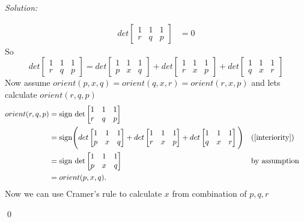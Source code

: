 \documentclass[a4paper, 8pt, oneside]{article}
\newenvironment{sol}
    {\emph{Solution:}
    }
    {
    \qed
    }
\begin{document}
\begin{enumerate}
\begin{enumerate}
\begin{sol}
\begin{align*}
det
\begin{bmatrix}
    1 & 1 & 1\\
    r & q & p
\end{bmatrix} &= 0
\end{align*}
So
\begin{equation}\label{interiority}
det
\begin{bmatrix}
    1 & 1 & 1\\
    r & q & p
\end{bmatrix} =
det
\begin{bmatrix}
    1 & 1 & 1\\
    p& x & q
\end{bmatrix} +
det
\begin{bmatrix}
    1 & 1 & 1\\
    r & x& p
\end{bmatrix} +
det
\begin{bmatrix}
    1 & 1 & 1\\
    q & x & r
\end{bmatrix} 
\end{equation}
Now assume $orient(p,x,q) =orient(q,x,r) = orient(r,x,p)$ and lets calculate $orient(r,q,p)$
\begin{align*}
orient(r,q,p) &= \text{sign det}
\begin{bmatrix}
    1 & 1 & 1\\
    r & q & p
\end{bmatrix} \\&= \text{sign} \Bigg(
det
\begin{bmatrix}
    1 & 1 & 1\\
    p& x & q
\end{bmatrix} +
det
\begin{bmatrix}
    1 & 1 & 1\\
    r & x& p
\end{bmatrix} +
det
\begin{bmatrix}
    1 & 1 & 1\\
    q & x & r
\end{bmatrix} 
\Bigg) && (\ref{interiority}) \\&=
 \text{sign det}
\begin{bmatrix}
    1 & 1 & 1\\
    p & x & q
\end{bmatrix} && \text{by assumption}  \\&= orient(p,x,q).
\end{align*}
Now we can use Cramer's rule to calculate $x$ from combination of $p, q, r$
\begin{equation*}

\end{equation*}
\end{sol}
\end{enumerate}
\end{enumerate}
\end{document}
